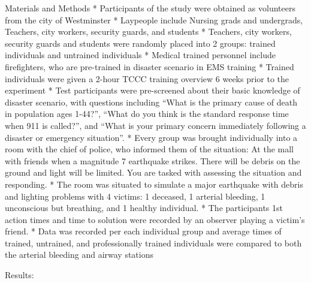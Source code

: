 \documentclass[]{article}
\begin{document}
Materials and Methods * Participants of the study were obtained as
volunteers from the city of Westminster * Laypeople include Nursing
grads and undergrads, Teachers, city workers, security guards, and
students * Teachers, city workers, security guards and students were
randomly placed into 2 groups: trained individuals and untrained
individuals * Medical trained personnel include firefighters, who are
pre-trained in disaster scenario in EMS training * Trained individuals
were given a 2-hour TCCC training overview 6 weeks prior to the
experiment * Test participants were pre-screened about their basic
knowledge of disaster scenario, with questions including ``What is the
primary cause of death in population ages 1-44?'', ``What do you think
is the standard response time when 911 is called?'', and ``What is your
primary concern immediately following a disaster or emergency
situation''. * Every group was brought individually into a room with the
chief of police, who informed them of the situation: At the mall with
friends when a magnitude 7 earthquake strikes. There will be debris on
the ground and light will be limited. You are tasked with assessing the
situation and responding. * The room was situated to simulate a major
earthquake with debris and lighting problems with 4 victims: 1 deceased,
1 arterial bleeding, 1 unconscious but breathing, and 1 healthy
individual. * The participants 1st action times and time to solution
were recorded by an observer playing a victim's friend. * Data was
recorded per each individual group and average times of trained,
untrained, and professionally trained individuals were compared to both
the arterial bleeding and airway stations

Results:
\end{document}
